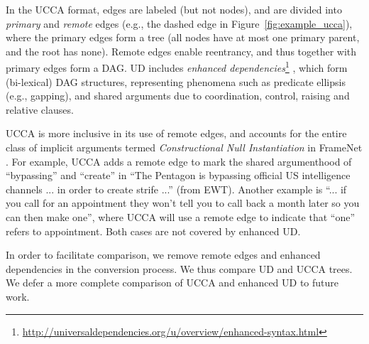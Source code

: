 \documentclass[11pt,a4paper]{article}
\newcommand{\oa}[1]{\footnote{\color{red}OA: #1}}
\begin{document}
In the UCCA format, edges are labeled (but not nodes),
and are divided into \textit{primary} and \textit{remote} edges
(e.g., the dashed edge in Figure~\ref{fig:example_ucca}),
where the primary edges form a tree (all nodes have at most one primary parent,
and the root has none).
Remote edges enable reentrancy, and thus together with primary edges form a DAG.
UD includes \textit{enhanced dependencies}\footnote{\url{http://universaldependencies.org/u/overview/enhanced-syntax.html}}
\cite{SCHUSTER16.779}, which form (bi-lexical) DAG structures, representing phenomena
such as predicate ellipsis (e.g., gapping),
and shared arguments due to coordination, control, raising and relative clauses.

UCCA is more inclusive in its use of remote edges, and accounts for 
the entire class of implicit arguments termed {\it Constructional Null Instantiation} in FrameNet \citep{Ruppenhofer:16}.
For example, UCCA adds a remote edge to mark the shared argumenthood of ``bypassing'' and
``create'' in ``The Pentagon is bypassing official US intelligence channels ... in order to create strife ...'' (from EWT). 
Another example is ``... if you call for an appointment they won't tell you to call back a month later so you can then make one'',
where UCCA will use a remote edge to indicate that ``one'' refers to appointment.
Both cases are not covered by enhanced UD.

In order to facilitate comparison, we remove remote edges and enhanced dependencies in the conversion process.
We thus compare UD and UCCA trees. We defer a more complete comparison of UCCA and enhanced UD to future work.





\end{document}
